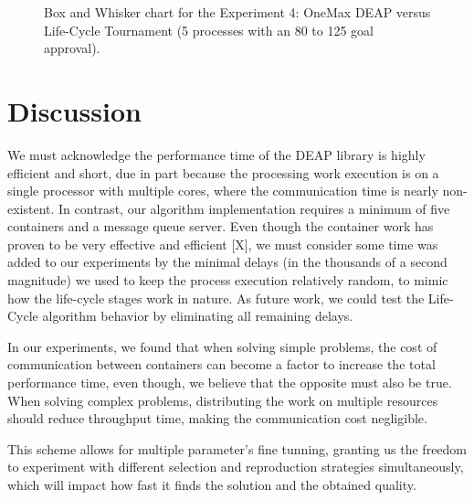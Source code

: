 \documentclass[runningheads]{llncs}
\begin{document}
\begin{figure}
    \caption{Box and Whisker chart for the Experiment 4: OneMax DEAP versus Life-Cycle Tournament (5 processes with an 80 to 125 goal approval).} \label{fig9}
    \end{figure}



\section{Discussion}

We must acknowledge the performance time of the DEAP library is highly
efficient and short, due in part because the processing work execution is on a
single processor with multiple cores, where the communication time is nearly
non-existent. In contrast, our algorithm implementation requires a minimum of
five containers and a message queue server. Even though the container work has
proven to be very effective and efficient [X], we must consider some time was
added to our experiments by the minimal delays (in the thousands of a second
magnitude) we used to keep the process execution relatively random, to mimic
how the life-cycle stages work in nature. As future work, we could test the
Life-Cycle algorithm behavior by eliminating all remaining delays.

In our experiments, we found that when solving simple problems, the cost of
communication between containers can become a factor to increase the total
performance time, even though, we believe that the opposite must also be true.
When solving complex problems, distributing the work on multiple resources
should reduce throughput time, making the communication cost negligible.

This scheme allows for multiple parameter's fine tunning, granting us the
freedom to experiment with different selection and reproduction strategies
simultaneously, which will impact how fast it finds the solution and the
obtained quality.
\end{document}
